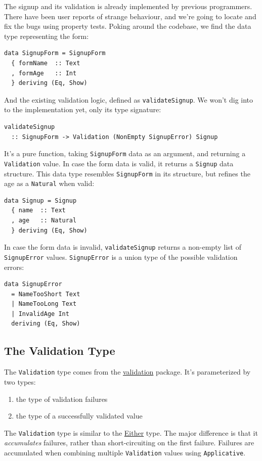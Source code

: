 \vspace{0.8\baselineskip}


\noindent The signup and its validation is already implemented by previous
programmers. There have been user reports of strange behaviour, and
we're going to locate and fix the bugs using property tests.
Poking around the codebase, we find the data type representing the form:

\begin{verbatim}
data SignupForm = SignupForm
  { formName  :: Text
  , formAge   :: Int
  } deriving (Eq, Show)
\end{verbatim}
And the existing validation logic, defined as \texttt{validateSignup}.
We won't dig into to the implementation yet, only its type signature:

\begin{verbatim}
validateSignup
  :: SignupForm -> Validation (NonEmpty SignupError) Signup
\end{verbatim}
It's a pure function, taking \texttt{SignupForm} data as an argument,
and returning a \texttt{Validation} value. In case the form data is
valid, it returns a \texttt{Signup} data structure. This data type
resembles \texttt{SignupForm} in its structure, but refines the age as a
\texttt{Natural} when valid:

\begin{verbatim}
data Signup = Signup
  { name  :: Text
  , age   :: Natural
  } deriving (Eq, Show)
\end{verbatim}
In case the form data is invalid, \texttt{validateSignup} returns a
non-empty list of \texttt{SignupError} values. \texttt{SignupError} is a
union type of the possible validation errors:

\begin{verbatim}
data SignupError
  = NameTooShort Text
  | NameTooLong Text
  | InvalidAge Int
  deriving (Eq, Show)
\end{verbatim}



\subsection{The Validation Type}\label{the-validation-type}

The \texttt{Validation} type comes from the
\href{https://hackage.haskell.org/package/validation}{validation}
package. It's parameterized by two types:

\begin{enumerate}
\def\labelenumi{\arabic{enumi}.}

\item
  the type of validation failures
\item
  the type of a successfully validated value
\end{enumerate}
The \texttt{Validation} type is similar to the
\href{https://hackage.haskell.org/package/base-4.12.0.0/docs/Data-Either.html\#t:Either}{Either}
type. The major difference is that it \emph{accumulates} failures,
rather than short-circuiting on the first failure. Failures are
accumulated when combining multiple \texttt{Validation} values using
\texttt{Applicative}.

